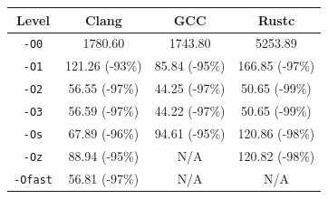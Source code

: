 \begin{tabular*}{\columnwidth}{@{\extracolsep\fill}cccc@{\extracolsep\fill}}
\toprule
\textbf{Level} & \textbf{Clang} & \textbf{GCC} & \textbf{Rustc} \\
\midrule
\texttt{-O0} & 1780.60 & 1743.80 & 5253.89 \\
\texttt{-O1} & 121.26 (-93\%) & 85.84 (-95\%) & 166.85 (-97\%) \\
\texttt{-O2} & 56.55 (-97\%) & 44.25 (-97\%) & 50.65 (-99\%) \\
\texttt{-O3} & 56.59 (-97\%) & 44.22 (-97\%) & 50.65 (-99\%) \\
\texttt{-Os} & 67.89 (-96\%) & 94.61 (-95\%) & 120.86 (-98\%) \\
\texttt{-Oz} & 88.94 (-95\%) & N/A & 120.82 (-98\%) \\
\texttt{-Ofast} & 56.81 (-97\%) & N/A & N/A \\
\bottomrule
\end{tabular*}
